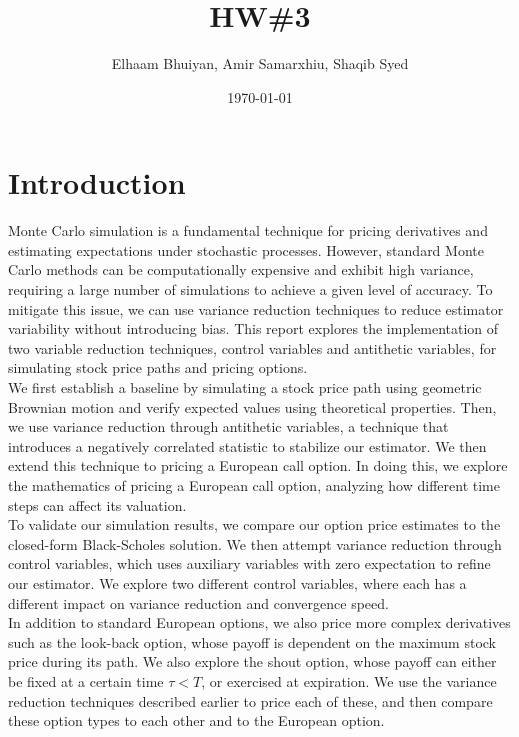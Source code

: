 \documentclass{report}
\title{HW\#3}
\author{
Elhaam Bhuiyan,
Amir Samarxhiu,
Shaqib Syed
}
\date{\today}
\begin{document}
\maketitle

\section*{Introduction}
Monte Carlo simulation is a fundamental technique for pricing derivatives and estimating expectations under stochastic processes. However, standard Monte Carlo methods can be computationally expensive and exhibit high variance, requiring a large number of simulations to achieve a given level of accuracy. To mitigate this issue, we can use variance reduction techniques to reduce estimator variability without introducing bias. This report explores the implementation of two variable reduction techniques, control variables and antithetic variables, for simulating stock price paths and pricing options. \\

We first establish a baseline by simulating a stock price path using geometric Brownian motion and verify expected values using theoretical properties. Then, we use variance reduction through antithetic variables, a technique that introduces a negatively correlated statistic to stabilize our estimator. We then extend this technique to pricing a European call option. In doing this, we explore the mathematics of pricing a European call option, analyzing how different time steps can affect its valuation. \\

To validate our simulation results, we compare our option price estimates to the closed-form Black-Scholes solution. We then attempt variance reduction through control variables, which uses auxiliary variables with zero expectation to refine our estimator. We explore two different control variables, where each has a different impact on variance reduction and convergence speed. \\

In addition to standard European options, we also price more complex derivatives such as the look-back option, whose payoff is dependent on the maximum stock price during its path. We also explore the shout option, whose payoff can either be fixed at a certain time $\tau < T$, or exercised at expiration. We use the variance reduction techniques described earlier to price each of these, and then compare these option types to each other and to the European option. \\
\end{document}
